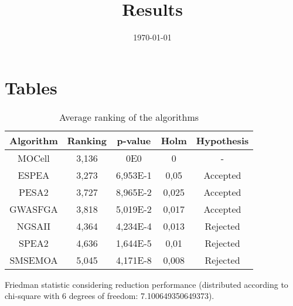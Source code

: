 \documentclass{article}
\title{Results}
\author{}
\date{\today}
\begin{document}
\oddsidemargin 0in \topmargin 0in\maketitle

\section{Tables}
\begin{table}[!htp]
\centering
\begin{tabular}{c|c|c|c|c}
Algorithm&Ranking&p-value&Holm&Hypothesis\\
\hline
MOCell & 3,136 & 0E0 & 0 & -\\
ESPEA & 3,273 & 6,953E-1 & 0,05 & Accepted\\
PESA2 & 3,727 & 8,965E-2 & 0,025 & Accepted\\
GWASFGA & 3,818 & 5,019E-2 & 0,017 & Accepted\\
NGSAII & 4,364 & 4,234E-4 & 0,013 & Rejected\\
SPEA2 & 4,636 & 1,644E-5 & 0,01 & Rejected\\
SMSEMOA & 5,045 & 4,171E-8 & 0,008 & Rejected\\
\end{tabular}
\caption{Average ranking of the algorithms}
\end{table}


Friedman statistic considering reduction performance (distributed according to chi-square with 6 degrees of freedom: 7.100649350649373).
\end{document}
